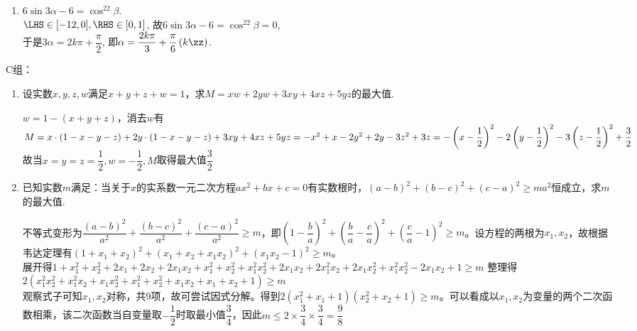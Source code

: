 \begin{enumerate}
\begin{jieda}
\begin{enumerate}
\item $6\sin3\alpha-6=\cos^22\beta$. \\
$\LHS\in[-12,0],\RHS\in[0,1]$, 故$6\sin3\alpha-6=\cos^22\beta=0$, \\
于是$3\alpha=2k\pi+\dfrac{\pi}{2}$, 即$\alpha=\dfrac{2k\pi}{3}+\dfrac{\pi}{6}\left(k\zz\right)$. 
\end{enumerate}
\end{jieda}

\end{enumerate}

C组：
\begin{enumerate}
    \item 设实数$x, y, z, w$满足$x+y+z+w = 1$，求$M = xw + 2yw + 3xy + 4xz + 5yz$的最大值.
    \begin{jieda}
        $w = 1 - \left(x+y+z\right)$，消去$w$有$M = x\cdot\left(1-x-y-z\right) + 2y \cdot \left(1-x-y-z\right) + 3xy  + 4xz + 5yz \\ = -x^2 + x - 2y^2 + 2y - 3z^2 + 3z = -\left(x-\dfrac{1}{2}\right)^2 - 2\left(y - \dfrac{1}{2}\right)^2 - 3\left(z - \dfrac{1}{2}\right)^2 + \dfrac{3}{2}$ \\
        故当$x = y = z = \dfrac{1}{2}, w = -\dfrac{1}{2}, M$取得最大值$\dfrac{3}{2}$
    \end{jieda}
    \item 已知实数$m$满足：当关于$x$的实系数一元二次方程$ax^2+bx+c=0$有实数根时，$\left(a-b\right)^2+\left(b-c\right)^2+\left(c-a\right)^2 \geq ma^2$恒成立，求$m$的最大值.
    \begin{jieda}
        不等式变形为$\dfrac{\left(a-b\right)^2}{a^2}+\dfrac{\left(b-c\right)^2}{a^2}+\dfrac{\left(c-a\right)^2}{a^2} \geq m$，即$\left(1-\dfrac{b}{a}\right)^2 + \left(\dfrac{b}{a} - \dfrac{c}{a}\right)^2 + \left(\dfrac{c}{a} - 1\right)^2 \geq m$。设方程的两根为$x_1, x_2$，故根据韦达定理有$\left(1+x_1+x_2\right)^2 + \left(x_1+x_2+x_1x_2\right)^2 + \left(x_1x_2-1\right)^2 \geq m$。\\
        展开得$1+x_1^2+x_2^2+2x_1 + 2x_2+2x_1x_2 + x_1^2 + x_2^2 + x_1^2x_2^2 + 2x_1x_2 + 2x_1^2x_2 + 2x_1x_2^2 + x_1^2x_2^2 -2x_1x_2 + 1 \geq m$
        整理得$2\left(x_1^2x_2^2 + x_1^2x_2 + x_1x_2^2 + x_1^2 + x_2^2 + x_1x_2 + x_1 + x_2 + 1\right) \geq m$ \\
        观察式子可知$x_1, x_2$对称，共9项，故可尝试因式分解。得到$2\left(x_1^2 + x_1 + 1\right)\left(x_2^2 + x_2 + 1\right) \geq m$。可以看成以$x_1, x_2$为变量的两个二次函数相乘，该二次函数当自变量取$-\dfrac{1}{2}$时取最小值$\dfrac{3}{4}$，因此$m \leq 2 \times \dfrac{3}{4} \times \dfrac{3}{4} = \dfrac{9}{8}$

\end{jieda}
\end{enumerate}
